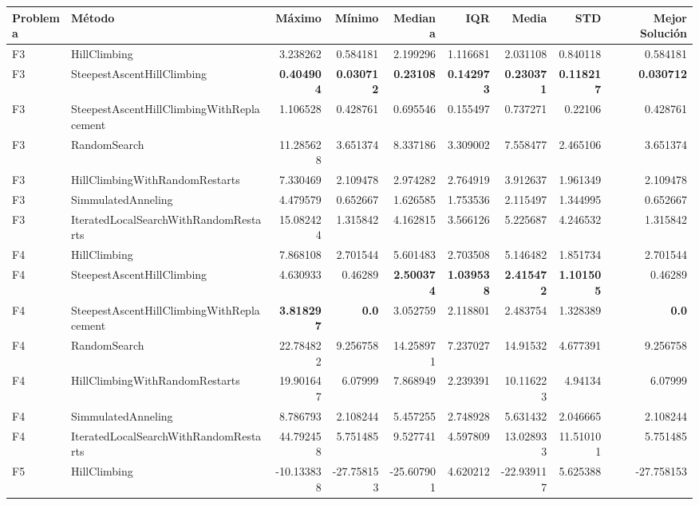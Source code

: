 \begin{tabular}{llrrrrrrr}
\toprule
Problema & Método & Máximo & Mínimo & Mediana & IQR & Media & STD & Mejor Solución \\ 
\midrule
F3 & HillClimbing & 3.238262 & 0.584181 & 2.199296 & 1.116681 & 2.031108 & 0.840118 & 0.584181 \\ 
F3 & SteepestAscentHillClimbing & \textbf{0.404904} & \textbf{0.030712} & \textbf{0.23108} & \textbf{0.142973} & \textbf{0.230371} & \textbf{0.118217} & \textbf{0.030712} \\ 
F3 & SteepestAscentHillClimbingWithReplacement & 1.106528 & 0.428761 & 0.695546 & 0.155497 & 0.737271 & 0.22106 & 0.428761 \\ 
F3 & RandomSearch & 11.285628 & 3.651374 & 8.337186 & 3.309002 & 7.558477 & 2.465106 & 3.651374 \\ 
F3 & HillClimbingWithRandomRestarts & 7.330469 & 2.109478 & 2.974282 & 2.764919 & 3.912637 & 1.961349 & 2.109478 \\ 
F3 & SimmulatedAnneling & 4.479579 & 0.652667 & 1.626585 & 1.753536 & 2.115497 & 1.344995 & 0.652667 \\ 
F3 & IteratedLocalSearchWithRandomRestarts & 15.082424 & 1.315842 & 4.162815 & 3.566126 & 5.225687 & 4.246532 & 1.315842 \\ 
F4 & HillClimbing & 7.868108 & 2.701544 & 5.601483 & 2.703508 & 5.146482 & 1.851734 & 2.701544 \\ 
F4 & SteepestAscentHillClimbing & 4.630933 & 0.46289 & \textbf{2.500374} & \textbf{1.039538} & \textbf{2.415472} & \textbf{1.101505} & 0.46289 \\ 
F4 & SteepestAscentHillClimbingWithReplacement & \textbf{3.818297} & \textbf{0.0} & 3.052759 & 2.118801 & 2.483754 & 1.328389 & \textbf{0.0} \\ 
F4 & RandomSearch & 22.784822 & 9.256758 & 14.258971 & 7.237027 & 14.91532 & 4.677391 & 9.256758 \\ 
F4 & HillClimbingWithRandomRestarts & 19.901647 & 6.07999 & 7.868949 & 2.239391 & 10.116223 & 4.94134 & 6.07999 \\ 
F4 & SimmulatedAnneling & 8.786793 & 2.108244 & 5.457255 & 2.748928 & 5.631432 & 2.046665 & 2.108244 \\ 
F4 & IteratedLocalSearchWithRandomRestarts & 44.792458 & 5.751485 & 9.527741 & 4.597809 & 13.028933 & 11.510101 & 5.751485 \\ 
F5 & HillClimbing & -10.133838 & -27.758153 & -25.607901 & 4.620212 & -22.939117 & 5.625388 & -27.758153 \\ 

\end{tabular}
